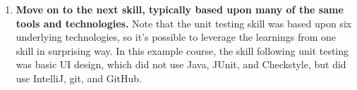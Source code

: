 \begin{enumerate}
\item {\bf Move on to the next skill, typically based upon many of the same tools and technologies.} Note that the unit testing skill was based upon six underlying technologies, so it's possible to leverage the learnings from one skill in surprising way. In this example course, the skill following unit testing was basic UI design, which did not use Java, JUnit, and Checkstyle, but did use IntelliJ, git, and GitHub. 


\end{enumerate} 














